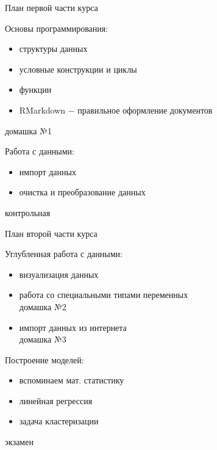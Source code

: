 \documentclass[notes,12pt, aspectratio=169]{beamer}
\newenvironment{wideitemize}{\itemize\addtolength{\itemsep}{10pt}}{\enditemize}
\begin{document}
\begin{frame}{План первой части курса}
	\begin{wideitemize}
		
		\item Основы программирования:
		\begin{itemize}
			\item структуры данных
			\item условные конструкции и циклы
			\item функции 
			\item RMarkdown $-$ правильное оформление документов
		\end{itemize}
		\alert{домашка №1}
		
		\item Работа с данными:
		\begin{itemize}
			\item импорт данных
			\item очистка и преобразование данных
		\end{itemize}		
		\alert{контрольная}
	
	\end{wideitemize} 
	
\end{frame}

\begin{frame}{План второй части курса}
	\begin{wideitemize}
				
		\item Углубленная работа с данными:
		\begin{itemize}
			\item визуализация данных
			\item работа со специальными типами переменных \\
			\alert{домашка №2}
			\item импорт данных из интернета \\
			\alert{домашка №3}
		\end{itemize}	
	
		\item Построение моделей:
		\begin{itemize}
			\item вспоминаем мат. статистику
			\item линейная регрессия
			\item задача кластеризации
		\end{itemize}

		\alert{экзамен}	
		
	\end{wideitemize} 
	
\end{frame}
\end{document}

